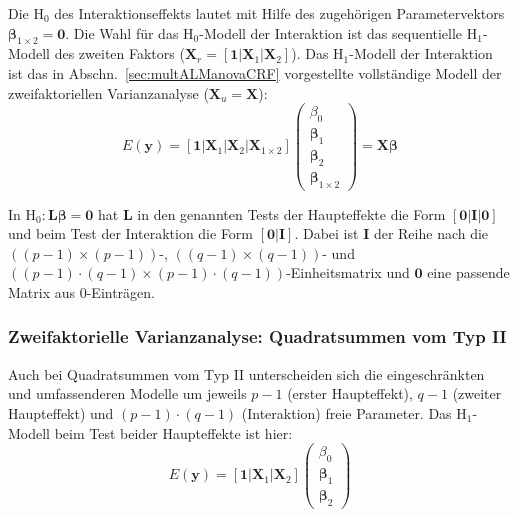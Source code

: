 Die $\text{H}_{0}$ des Interaktionseffekts lautet mit Hilfe des zugehörigen Parametervektors $\bm{\beta}_{1 \times 2} = \bm{0}$. Die Wahl für das $\text{H}_{0}$-Modell der Interaktion ist das sequentielle $\text{H}_{1}$-Modell des zweiten Faktors ($\bm{X}_{r} = [\bm{1} | \bm{X}_{1} | \bm{X}_{2}]$). Das $\text{H}_{1}$-Modell der Interaktion ist das in Abschn.\ \ref{sec:multALManovaCRF} vorgestellte vollständige Modell der zweifaktoriellen Varianzanalyse ($\bm{X}_{u} = \bm{X}$):
\begin{equation*}
E(\bm{y}) = [\bm{1} | \bm{X}_{1} | \bm{X}_{2} | \bm{X}_{1 \times 2}] \left(\begin{array}{l} \beta_{0} \\ \bm{\beta}_{1}  \\ \bm{\beta}_{2} \\ \bm{\beta}_{1 \times 2}\end{array}\right) = \bm{X} \bm{\beta}
\end{equation*}

In $\text{H}_{0}: \bm{L} \bm{\beta} = \bm{0}$ hat $\bm{L}$ in den genannten Tests der Haupteffekte die Form $[\bm{0} | \bm{I} | \bm{0}]$ und beim Test der Interaktion die Form $[\bm{0} | \bm{I}]$. Dabei ist $\bm{I}$ der Reihe nach die $((p-1) \times (p-1))$-, $((q-1) \times (q-1))$- und $((p-1) \cdot (q-1) \times (p-1) \cdot (q-1))$-Einheitsmatrix und $\bm{0}$ eine passende Matrix aus $0$-Einträgen.

\subsubsection{Zweifaktorielle Varianzanalyse: Quadratsummen vom Typ II}

Auch bei Quadratsummen vom Typ II unterscheiden sich die eingeschränkten und umfassenderen Modelle um jeweils $p-1$ (erster Haupteffekt), $q-1$ (zweiter Haupteffekt) und $(p-1) \cdot (q-1)$ (Interaktion) freie Parameter. Das $\text{H}_{1}$-Modell beim Test beider Haupteffekte ist hier:
\begin{equation*}
E(\bm{y}) = [\bm{1} | \bm{X}_{1} | \bm{X}_{2}] \left(\begin{array}{l} \beta_{0} \\ \bm{\beta}_{1} \\ \bm{\beta}_{2}\end{array}\right)
\end{equation*}

